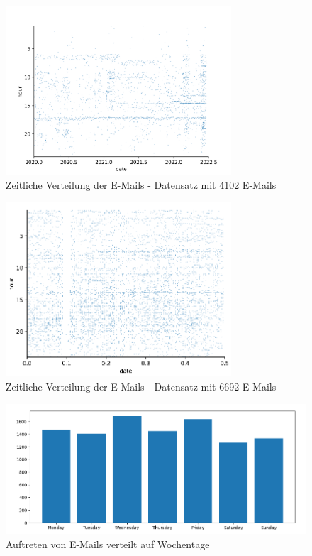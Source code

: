 \begin{figure}
    \centering
    \includegraphics[width=0.75\textwidth]{images/plot.PNG}
    \caption{Zeitliche Verteilung der E-Mails - Datensatz mit 4102 E-Mails} 
    \label{fig:auswertungzeitlich}
\end{figure}

\begin{figure}
    \centering
    \includegraphics[width=0.75\textwidth]{images/merged_plot.PNG}
    \caption{Zeitliche Verteilung der E-Mails - Datensatz mit 6692 E-Mails} 
    \label{fig:auswertungzeitlichmerged}
\end{figure}

\begin{figure}
    \centering
    \includegraphics[width=1\textwidth]{images/received_mails_per_weekday.PNG}
    \caption{Auftreten von E-Mails verteilt auf Wochentage} 
    \label{fig:plotweekdays}
\end{figure}

\newpage